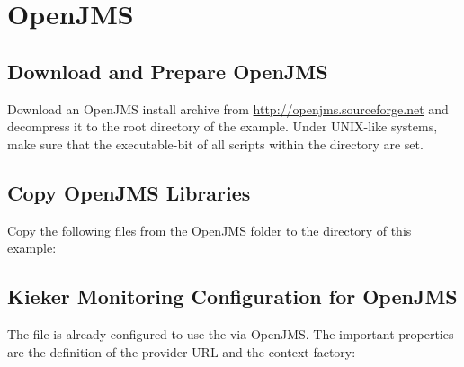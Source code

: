 
\section{OpenJMS}\label{example:jms:openjms}

\subsection{Download and Prepare OpenJMS}

Download an OpenJMS install archive from \url{http://openjms.sourceforge.net} %
and decompress it to the root directory of the example. Under UNIX-like systems, make sure that the executable-bit of all scripts within the  directory are set.

\subsection{Copy OpenJMS Libraries}

Copy the following files from the OpenJMS  folder to the %
 directory of this example:

\medskip

\begin{compactenum}
\item {}
\item {}
\item {}
\item {}
\item {}
\item {}
\end{compactenum}

\subsection{Kieker Monitoring Configuration for OpenJMS}

The file  %
is already configured to use the  via OpenJMS. The important properties are %
the definition of the provider URL and the context factory:

\setPropertiesListing


